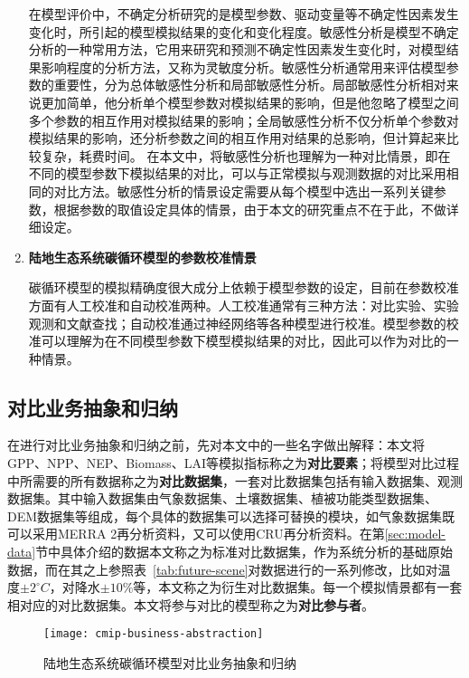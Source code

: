 \begin{enumerate}[(1)]
在模型评价中，不确定分析研究的是模型参数、驱动变量等不确定性因素发生变化时，所引起的模型模拟结果的变化和变化程度。敏感性分析是模型不确定分析的一种常用方法，它用来研究和预测不确定性因素发生变化时，对模型结果影响程度的分析方法，又称为灵敏度分析。敏感性分析通常用来评估模型参数的重要性，分为总体敏感性分析和局部敏感性分析。局部敏感性分析相对来说更加简单，他分析单个模型参数对模拟结果的影响，但是他忽略了模型之间多个参数的相互作用对模拟结果的影响；全局敏感性分析不仅分析单个参数对模拟结果的影响，还分析参数之间的相互作用对结果的总影响，但计算起来比较复杂，耗费时间。
在本文中，将敏感性分析也理解为一种对比情景，即在不同的模型参数下模拟结果的对比，可以与正常模拟与观测数据的对比采用相同的对比方法。敏感性分析的情景设定需要从每个模型中选出一系列关键参数，根据参数的取值设定具体的情景，由于本文的研究重点不在于此，不做详细设定。

\item \textbf{陆地生态系统碳循环模型的参数校准情景}

碳循环模型的模拟精确度很大成分上依赖于模型参数的设定，目前在参数校准方面有人工校准和自动校准两种。人工校准通常有三种方法：对比实验、实验观测和文献查找；自动校准通过神经网络等各种模型进行校准。模型参数的校准可以理解为在不同模型参数下模型模拟结果的对比，因此可以作为对比的一种情景。

\end{enumerate}

\subsection{对比业务抽象和归纳}

在进行对比业务抽象和归纳之前，先对本文中的一些名字做出解释：本文将GPP、NPP、NEP、Biomass、LAI等模拟指标称之为\textbf{对比要素}；将模型对比过程中所需要的所有数据称之为\textbf{对比数据集}，一套对比数据集包括有输入数据集、观测数据集。其中输入数据集由气象数据集、土壤数据集、植被功能类型数据集、DEM数据集等组成，每个具体的数据集可以选择可替换的模块，如气象数据集既可以采用MERRA 2再分析资料，又可以使用CRU再分析资料。在第\ref{sec:model-data}节中具体介绍的数据本文称之为标准对比数据集，作为系统分析的基础原始数据，而在其之上参照表~\ref{tab:future-scene}对数据进行的一系列修改，比如对温度$\pm2^{\circ}C$，对降水$\pm10\%$等，本文称之为衍生对比数据集。每一个模拟情景都有一套相对应的对比数据集。本文将参与对比的模型称之为\textbf{对比参与者}。

\begin{figure}[!htbp]
    \centering
    \texttt{[image: cmip-business-abstraction]}
    \caption{陆地生态系统碳循环模型对比业务抽象和归纳}
    \label{fig:cmip-business-abstraction}
\end{figure}

